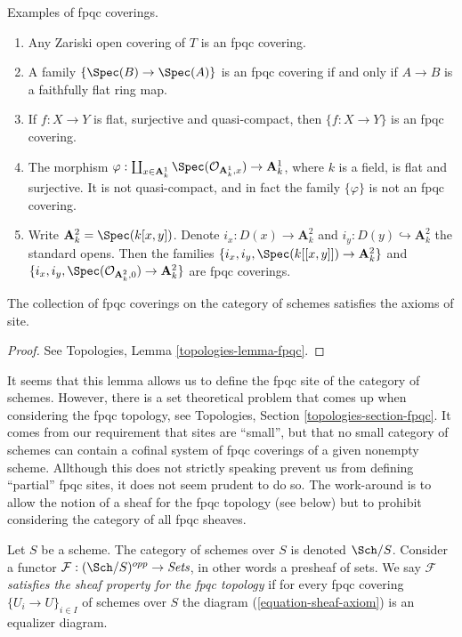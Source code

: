 \begin{example}
\label{example-fpqc-coverings}
Examples of fpqc coverings.
\begin{enumerate}
\item Any Zariski open covering of $T$ is an fpqc covering.
\item A family $\{\Spec(B) \to \Spec(A)\}$ is an fpqc
covering if and only if $A \to B$ is a faithfully flat ring map.
\item If $f: X \to Y$ is flat, surjective and quasi-compact, then $\{ f: X\to
Y\}$ is an fpqc covering.
\item The morphism
$\varphi :
\coprod_{x \in \mathbf{A}^1_k} \Spec(\mathcal{O}_{\mathbf{A}^1_k, x})
\to \mathbf{A}^1_k$,
where $k$ is a field, is flat and surjective. It is not quasi-compact, and
in fact the family $\{\varphi\}$ is not an fpqc covering.
\item Write
$\mathbf{A}^2_k = \Spec(k[x, y])$. Denote $i_x : D(x) \to \mathbf{A}^2_k$
and $i_y : D(y) \hookrightarrow \mathbf{A}^2_k$ the standard opens.
Then the families
$\{i_x, i_y, \Spec(k[[x, y]]) \to \mathbf{A}^2_k\}$
and
$\{i_x, i_y, \Spec(\mathcal{O}_{\mathbf{A}^2_k, 0}) \to \mathbf{A}^2_k\}$
are fpqc coverings.
\end{enumerate}
\end{example}

\begin{lemma}
\label{lemma-site-fpqc}
The collection of fpqc coverings on the category of schemes
satisfies the axioms of site.
\end{lemma}

\begin{proof}
See Topologies, Lemma \ref{topologies-lemma-fpqc}.
\end{proof}

\noindent
It seems that this lemma allows us to define the fpqc site of the category
of schemes. However, there is a set theoretical problem that comes up when
considering the fpqc topology, see
Topologies, Section \ref{topologies-section-fpqc}.
It comes from our requirement that sites are ``small'', but that no small
category of schemes can contain a cofinal system of fpqc coverings of a
given nonempty scheme. Allthough this does not strictly speaking prevent
us from defining  ``partial'' fpqc
sites, it does not seem prudent to do so. The work-around is to allow
the notion of a sheaf for the fpqc topology (see below) but to prohibit
considering the category of all fpqc sheaves.

\begin{definition}
\label{definition-sheaf-property-fpqc}
Let $S$ be a scheme. The category of schemes over $S$ is denoted
$\Sch/S$. Consider a functor
$\mathcal{F} : (\Sch/S)^{opp} \to \textit{Sets}$, in other words
a presheaf of sets. We say $\mathcal{F}$
{\it satisfies the sheaf property for the fpqc topology}
if for every fpqc covering $\{U_i \to U\}_{i \in I}$ of schemes over $S$
the diagram (\ref{equation-sheaf-axiom}) is an equalizer diagram.
\end{definition}


